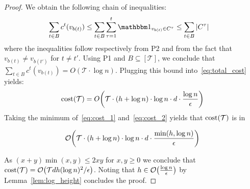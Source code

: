 \begin{proof}
We obtain the following chain of inequalities:
\begin{align}
    \sum_{t \in B} c^t(v_{b(t)})
    &\le \sum _{t \in B} \sum_{\tau=1}^{t} \Ind_{v_{b(t)} \in C^{\tau}}
    \le \sum _{t \in B} |C^{\tau}|
\end{align}
where the inequalities follow respectively from P2 and from the fact that $v_{b(t)} \ne v_{b(t')}$ for $t \ne t'$. Using P1 and $B \subseteq [\mathcal T]$, we conclude that $\sum_{t \in B} c^t(v_{b(t)}) = O\!\left( \mathcal{T} \cdot \log n \right)$. Plugging this bound into~\eqref{eq:total_cost} yields:
\begin{equation}\label{eq:cost_2}
    \operatorname*{\operatorname{cost}}(\mathcal T) = O\!\left(  \mathcal{T} \cdot (h + \log n) \cdot \log n \cdot d \cdot \frac{\log n}{\epsilon} \right) 
\end{equation}
Taking the minimum of~\eqref{eq:cost_1} and~\eqref{eq:cost_2} yields that  $\operatorname*{\operatorname{cost}}(\mathcal T)$ is in

\begin{align}
    \mathcal{O}\!\left( \mathcal{T} \cdot (h + \log n) \cdot \log n \cdot d \cdot  \frac{\min(h, \log n)}{\epsilon} \right)
\end{align}



As $(x+y)\min(x,y) \le 2 xy$ for $x,y \ge 0$ we conclude that $\operatorname*{\operatorname{cost}}(\mathcal T) = \mathcal{O}\big(\mathcal{T} d h (\log n)^2 / \epsilon \big)$. Noting that $h \in \mathcal{O}\big(\frac{\log n}{\epsilon}\big)$ by Lemma~\ref{lem:log_height} concludes the proof.
\end{proof}

